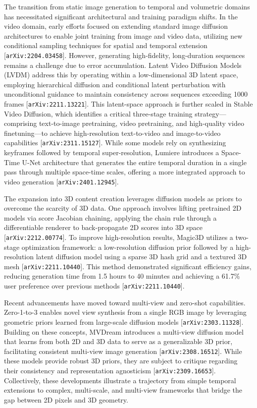 \documentclass[11pt]{article}
\begin{document}
The transition from static image generation to temporal and volumetric domains has necessitated significant architectural and training paradigm shifts. In the video domain, early efforts focused on extending standard image diffusion architectures to enable joint training from image and video data, utilizing new conditional sampling techniques for spatial and temporal extension [\texttt{arXiv:2204.03458}]. However, generating high-fidelity, long-duration sequences remains a challenge due to error accumulation. Latent Video Diffusion Models (LVDM) address this by operating within a low-dimensional 3D latent space, employing hierarchical diffusion and conditional latent perturbation with unconditional guidance to maintain consistency across sequences exceeding 1000 frames [\texttt{arXiv:2211.13221}]. This latent-space approach is further scaled in Stable Video Diffusion, which identifies a critical three-stage training strategy—comprising text-to-image pretraining, video pretraining, and high-quality video finetuning—to achieve high-resolution text-to-video and image-to-video capabilities [\texttt{arXiv:2311.15127}]. While some models rely on synthesizing keyframes followed by temporal super-resolution, Lumiere introduces a Space-Time U-Net architecture that generates the entire temporal duration in a single pass through multiple space-time scales, offering a more integrated approach to video generation [\texttt{arXiv:2401.12945}].

The expansion into 3D content creation leverages diffusion models as priors to overcome the scarcity of 3D data. One approach involves lifting pretrained 2D models via score Jacobian chaining, applying the chain rule through a differentiable renderer to back-propagate 2D scores into 3D space [\texttt{arXiv:2212.00774}]. To improve high-resolution results, Magic3D utilizes a two-stage optimization framework: a low-resolution diffusion prior followed by a high-resolution latent diffusion model using a sparse 3D hash grid and a textured 3D mesh [\texttt{arXiv:2211.10440}]. This method demonstrated significant efficiency gains, reducing generation time from 1.5 hours to 40 minutes and achieving a 61.7\% user preference over previous methods [\texttt{arXiv:2211.10440}].

Recent advancements have moved toward multi-view and zero-shot capabilities. Zero-1-to-3 enables novel view synthesis from a single RGB image by leveraging geometric priors learned from large-scale diffusion models [\texttt{arXiv:2303.11328}]. Building on these concepts, MVDream introduces a multi-view diffusion model that learns from both 2D and 3D data to serve as a generalizable 3D prior, facilitating consistent multi-view image generation [\texttt{arXiv:2308.16512}]. While these models provide robust 3D priors, they are subject to critique regarding their consistency and representation agnosticism [\texttt{arXiv:2309.16653}]. Collectively, these developments illustrate a trajectory from simple temporal extensions to complex, multi-scale, and multi-view frameworks that bridge the gap between 2D pixels and 3D geometry.
\end{document}
